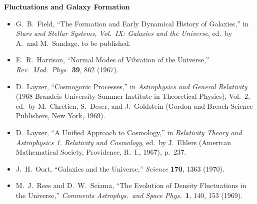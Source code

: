 \medskip
\noindent\textbf{Fluctuations and Galaxy Formation}\par
\begin{itemize}
  \item[\(\square\)] G.~B.~Field,
  ``The Formation and Early Dynamical History of Galaxies,'' in
  \emph{Stars and Stellar Systems, Vol.\ IX: Galaxies and the Universe},
  ed.\ by A.\ and M.~Sandage, to be published.

  \item[\(\square\)] E.~R.~Harrison,
  ``Normal Modes of Vibration of the Universe,''
  \emph{Rev.\ Mod.\ Phys.}\ \textbf{39}, 862 (1967).

  \item[\(\square\)] D.~Layzer, ``Cosmogonic Processes,'' in
  \emph{Astrophysics and General Relativity}
  (1968 Brandeis University Summer Institute in Theoretical Physics),
  Vol.~2, ed.\ by M.~Chretien, S.~Deser, and J.~Goldstein
  (Gordon and Breach Science Publishers, New York, 1969).

  \item[\(\square\)] D.~Layzer, ``A Unified Approach to Cosmology,'' in
  \emph{Relativity Theory and Astrophysics 1. Relativity and Cosmology},
  ed.\ by J.~Ehlers
  (American Mathematical Society, Providence, R.~I., 1967), p.~237.

  \item[\(\square\)] J.~H.~Oort, ``Galaxies and the Universe,''
  \emph{Science} \textbf{170}, 1363 (1970).

  \item[\(\square\)] M.~J.~Rees and D.~W.~Sciama,
  ``The Evolution of Density Fluctuations in the Universe,''
  \emph{Comments Astrophys.\ and Space Phys.}\ \textbf{1}, 140, 153 (1969).
\end{itemize}


